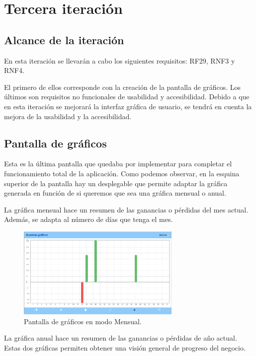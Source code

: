 \section{Tercera iteración}

\subsection{Alcance de la iteración}

En esta iteración se llevarán a cabo los siguientes requisitos: RF29, RNF3 y RNF4. 

El primero de ellos corresponde con la creación de la pantalla de gráficos. Los últimos son requisitos no funcionales de usabilidad y accesibilidad. Debido a que en esta iteración se mejorará la interfaz gráfica de usuario, se tendrá en cuenta la mejora de la usabilidad y la accesibilidad. 

\subsection{Pantalla de gráficos}

Esta es la última pantalla que quedaba por implementar para completar el funcionamiento total de la aplicación. Como podemos observar, en la esquina superior de la pantalla hay un desplegable que permite adaptar la gráfica generada en función de si queremos que sea una gráfica mensual o anual. 

La gráfica mensual hace un resumen de las ganancias o pérdidas del mes actual. Además, se adapta al número de días que tenga el mes. 


\begin{figure}[H]
	\centering
	\includegraphics[width=0.7\textwidth]{imagenes/TerceraIteracion/graficosMensual.png}
	\caption{Pantalla de gráficos en modo Mensual.}
	\label{fig:mensual}
\end{figure}

La gráfica anual hace un resumen de las ganancias o pérdidas de año actual. Estas dos gráficas permiten obtener una visión general de progreso del negocio. 

